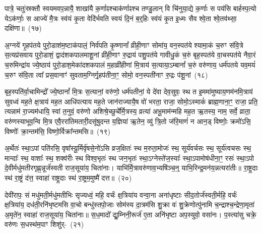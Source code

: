 पात्रे॒ चतुः॑स्रक्तौ स्वयमवप॒न्नायै॒ शाखा॑यै क॒र्णाꣴश्चा\-क॑र्णाꣴश्च तण्डु॒लान् वि चि॑नुया॒द्ये क॒र्णाः स पय॑सि बार्\mbox{}हस्प॒त्यो ये\-ऽक॑र्णाः॒ स आज्ये॑ मै॒त्रः स्व॑यं कृ॒ता वेदि॑र्भवति स्वयं दि॒नं ब॒र्॒\mbox{}हिः स्व॑यं कृ॒त इ॒ध्मः सैव श्वे॒ता श्वे॒तव॑थ्सा॒ दक्षि॑णा॥~(१७)\ip


{\anuvakamend[{सा॒वि॒त्रं द्वाद॑श\-कपाल॒माश्व॑त्थे॒ त्रय॑स्त्रिꣳशच्च}]}

अ॒ग्नये॑ गृ॒हप॑तये पुरो॒डाश॑\-म॒ष्टा\-क॑पालं॒ निर्व॑पति कृ॒ष्णानां᳚ व्रीही॒णाꣳ सोमा॑य॒ वन॒स्पत॑ये श्यामा॒कं च॒रुꣳ स॑वि॒त्रे स॒त्यप्र॑सवाय पुरो॒डाशं॒ द्वाद॑श\-कपालमाशू॒नां व्री॑ही॒णाꣳ रु॒द्राय॑ पशु॒पत॑ये गावीधु॒कं च॒रुं बृह॒स्पत॑ये वा॒चस्पत॑ये नैवा॒रं च॒रुमिन्द्रा॑य ज्ये॒ष्ठाय॑ पुरो॒डाश॒मेका॑\-दश\-कपालं म॒हाव्री॑हीणां मि॒त्राय॑ स॒त्याया॒\-ऽम्बानां᳚ च॒रुं वरु॑णाय॒ धर्म॑पतये यव॒मयं॑ च॒रुꣳ स॑वि॒ता त्वा᳚ प्रस॒वानाꣳ॑ सुवताम॒ग्निर्गृ॒हप॑तीना॒ꣳ॒ सोमो॒ वन॒स्पती॑नाꣳ रु॒द्रः प॑शू॒नां~(१८)\ip

बृह॒स्पति॑र्वा॒चामिन्द्रो᳚ ज्ये॒ष्ठानां᳚ मि॒त्रः स॒त्यानां॒ वरु॑णो॒ धर्म॑पतीनां॒ ये दे॑वा देव॒सुवः॒ स्थ त इ॒ममा॑मुष्याय॒णम॑\-नमि॒त्राय॑ सुवध्वं मह॒ते क्ष॒त्राय॑ मह॒त आधि॑पत्याय मह॒ते जान॑राज्यायै॒ष वो॑ भरता॒ राजा॒ सोमो॒\-ऽस्माकं॑ ब्राह्म॒णाना॒ꣳ॒ राजा॒ प्रति॒ त्यन्नाम॑ रा॒ज्यम॑धायि॒ स्वां त॒नुवं॒ वरु॑णो अशिश्रे॒च्छुचे᳚र्मि॒त्रस्य॒ व्रत्या॑ अभू॒माम॑न्महि मह॒त ऋ॒तस्य॒ नाम॒ सर्वे॒ व्राता॒ वरु॑णस्याभूव॒न्वि मि॒त्र एवै॒ररा॑तिमतारी॒दसू॑षुदन्त य॒ज्ञिया॑ ऋ॒तेन॒ व्यु॑ त्रि॒तो ज॑रि॒माणं॑ न आन॒ड् विष्णोः॒ क्रमो॑\-ऽसि॒ विष्णोः᳚ क्रा॒न्तम॑सि॒ विष्णो॒र्विक्रा᳚न्तमसि॥~(१९)\ip

{\anuvakamend[{प॒शू॒नां व्राताः॒ पञ्च॑विꣳशतिश्च}]}%

अ॒र्थेतः॑ स्था॒\-ऽपां पति॑रसि॒ वृषा᳚स्यू॒र्मिर्वृ॑षसे॒नो॑\-ऽसि व्रज॒क्षितः॑ स्थ म॒रुता॒मोजः॑ स्थ॒ सूर्य॑वर्चसः स्थ॒ सूर्य॑त्वचसः स्थ॒ मान्दाः᳚ स्थ॒ वाशाः᳚ स्थ॒ शक्व॑रीः स्थ विश्व॒भृतः॑ स्थ जन॒भृतः॑ स्था॒\-ऽग्नेस्ते॑ज॒स्याः᳚ स्था॒\-ऽपामोष॑धीना॒ꣳ॒ रसः॑ स्था॒\-ऽपो दे॒वीर्मधु॑मतीरगृह्ण॒न्नूर्ज॑स्वती राज॒सूया॑य॒ चिता॑नाः। याभि॑र्मि॒त्रावरु॑णाव॒भ्यषि॑ञ्च॒न्॒ याभि॒रिन्द्र॒मन॑य॒न्नत्यरा॑तीः॥ रा॒ष्ट्र॒दाः स्थ॑ रा॒ष्ट्रं द॑त्त॒ स्वाहा॑ राष्ट्र॒दाः स्थ॑ रा॒ष्ट्रम॒मुष्मै॑ दत्त॥~(२०)\ip

{\anuvakamend[{अत्येका॑\-दश च}]}%

देवी॑रापः॒ सं मधु॑मती॒र्मधु॑मतीभिः सृज्यध्वं॒ महि॒ वर्चः॑ क्ष॒त्रिया॑य वन्वा॒ना अना॑धृष्टाः सीद॒तोर्ज॑स्वती॒र्महि॒ वर्चः॑ क्ष॒त्रिया॑य॒ दध॑ती॒रनि॑भृष्टमसि वा॒चो बन्धु॑स्तपो॒जाः सोम॑स्य दा॒त्रम॑सि शु॒क्रा वः॑ शु॒क्रेणोत्पु॑नामि च॒न्द्राश्च॒न्द्रेणा॒मृता॑ अ॒मृते॑न॒ स्वाहा॑ राज॒सूया॑य॒ चिता॑नाः॥ स॒ध॒मादो᳚ द्यु॒म्निनी॒रूर्ज॑ ए॒ता अनि॑भृष्टा अप॒स्युवो॒ वसा॑नः। प॒स्त्या॑सु चक्रे॒ वरु॑णः स॒धस्थ॑म॒पाꣳ शिशु॑र्-~(२१)\ip

